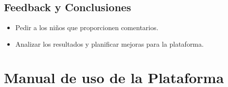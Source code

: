 \begin{appendices}
\section{Feedback y Conclusiones}
\begin{itemize}
    \item Pedir a los niños que proporcionen comentarios.
    \item Analizar los resultados y planificar mejoras para la plataforma.
\end{itemize}


\chapter{Manual de uso de la Plataforma}

\end{appendices}